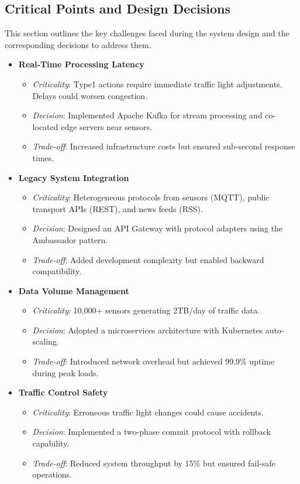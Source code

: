 \documentclass[11.5pt]{article}
\begin{document}
    \subsection{Critical Points and Design Decisions}
    This section outlines the key challenges faced during the system design and the corresponding decisions to address them.    
    \begin{itemize}
        \item \textbf{Real-Time Processing Latency}
        \begin{itemize}
            \item \textit{Criticality}: Type1 actions require immediate traffic light adjustments. Delays could worsen congestion.
            \item \textit{Decision}: Implemented Apache Kafka for stream processing and co-located edge servers near sensors.
            \item \textit{Trade-off}: Increased infrastructure costs but ensured sub-second response times.
        \end{itemize}
        
        \item \textbf{Legacy System Integration}
        \begin{itemize}
            \item \textit{Criticality}: Heterogeneous protocols from sensors (MQTT), public transport APIs (REST), and news feeds (RSS).
            \item \textit{Decision}: Designed an API Gateway with protocol adapters using the Ambassador pattern.
            \item \textit{Trade-off}: Added development complexity but enabled backward compatibility.
        \end{itemize}
        
        \item \textbf{Data Volume Management}
        \begin{itemize}
            \item \textit{Criticality}: 10,000+ sensors generating 2TB/day of traffic data.
            \item \textit{Decision}: Adopted a microservices architecture with Kubernetes auto-scaling.
            \item \textit{Trade-off}: Introduced network overhead but achieved 99.9\% uptime during peak loads.
        \end{itemize}
        
        \item \textbf{Traffic Control Safety}
        \begin{itemize}
            \item \textit{Criticality}: Erroneous traffic light changes could cause accidents.
            \item \textit{Decision}: Implemented a two-phase commit protocol with rollback capability.
            \item \textit{Trade-off}: Reduced system throughput by 15\% but ensured fail-safe operations.
        \end{itemize}
        

\end{itemize}
\end{document}
